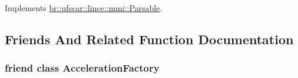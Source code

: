 Implements \hyperlink{classbr_1_1ufscar_1_1lince_1_1mmi_1_1Parsable_a6524a0a77abb3865e5d255e466b6159e}{br::ufscar::lince::mmi::Parsable}.



\subsection{Friends And Related Function Documentation}
\hypertarget{classbr_1_1ufscar_1_1lince_1_1mmi_1_1AccelerationEvent_a5414bf6fb99d97af5a0b33c831e67026}{
\subsubsection[{AccelerationFactory}]{\setlength{\rightskip}{0pt plus 5cm}friend class {\bf AccelerationFactory}}}
\label{classbr_1_1ufscar_1_1lince_1_1mmi_1_1AccelerationEvent_a5414bf6fb99d97af5a0b33c831e67026}


